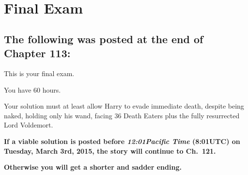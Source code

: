 \chapter{Final Exam}

\section{The following was posted at the end of Chapter 113:}


\setlength{\parskip}{.5\baselineskip}

This is your final exam.

You have 60 hours.

Your solution must at least allow Harry to evade immediate death,
despite being naked, holding only his wand, facing 36 Death Eaters
plus the fully resurrected Lord Voldemort.

\textbf{If a viable solution is posted before \emph{12:01\am Pacific Time} (8:01\am UTC) on Tuesday, March 3rd, 2015, the story will continue to Ch.~121.}

\textbf{Otherwise you will get a shorter and sadder ending.}


